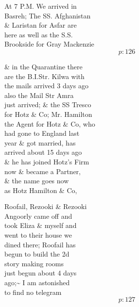 \documentclass{report}
\begin{document}
	\par{
 	At 7 P.M. We arrived in\ \\Basreh; The SS. Afghanistan\ \\\& Laristan for Asfar are\ \\here as well as the S.S.\ \\Brookside for Gray Mackenzie\ \\
  \[p: 126 \]

	}


	\par{
 	\& in the Quarantine there\ \\are the B.I.Str. Kilwa with\ \\the mails arrived 3 days ago\ \\also the Mail Str Amra\ \\just arrived; \& the SS Tresco\ \\for Hotz \& Co; Mr. Hamilton\ \\the Agent for Hotz \& Co, who\ \\had gone to England last\ \\year \& got married, has\ \\arrived about 15 days ago\ \\\& he has joined Hotz's Firm\ \\now \& became a Partner,\ \\\& the name goes now\ \\as Hotz Hamilton \& Co,\ \\
	}

	\par{
 	Roofail, Rezooki \& Rezooki\ \\Angoorly came off and\ \\took Eliza \& myself and\ \\went to their house we\ \\dined there; Roofail has\ \\begun to build the 2d\ \\story making rooms\ \\just begun about 4 days\ \\ago;\~{} I am astonished\ \\to find no telegram\ \\
  \[p: 127 \]

	}

\end{document}
